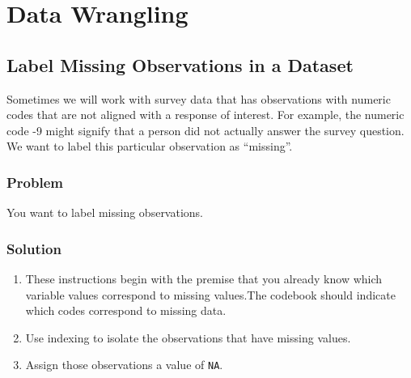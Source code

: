 \documentclass[
]{book}
\newenvironment{Shaded}{\begin{snugshade}}{\end{snugshade}}
\newcommand{\ConstantTok}[1]{\textcolor[rgb]{0.00,0.00,0.00}{#1}}
\newcommand{\NormalTok}[1]{#1}
\newcommand{\OtherTok}[1]{\textcolor[rgb]{0.56,0.35,0.01}{#1}}
\newcommand{\SpecialCharTok}[1]{\textcolor[rgb]{0.00,0.00,0.00}{#1}}
\providecommand{\tightlist}{%
  \setlength{\itemsep}{0pt}\setlength{\parskip}{0pt}}
\begin{document}
\hypertarget{data-wrangling}{%
\chapter{Data Wrangling}\label{data-wrangling}}

\hypertarget{missing}{%
\section{Label Missing Observations in a Dataset}\label{missing}}

Sometimes we will work with survey data that has observations with numeric codes that are not aligned with a response of interest. For example, the numeric code -9 might signify that a person did not actually answer the survey question. We want to label this particular observation as ``missing''.

\hypertarget{problem-16}{%
\subsection{Problem}\label{problem-16}}

You want to label missing observations.

\hypertarget{solution-16}{%
\subsection{Solution}\label{solution-16}}

\begin{enumerate}
\def\labelenumi{\arabic{enumi}.}
\tightlist
\item
  These instructions begin with the premise that you already know which variable values correspond to missing values.The codebook should indicate which codes correspond to missing data.
\item
  Use indexing to isolate the observations that have missing values.
\item
  Assign those observations a value of \texttt{NA}.
\end{enumerate}

\begin{Shaded}
\end{Shaded}
\end{document}
